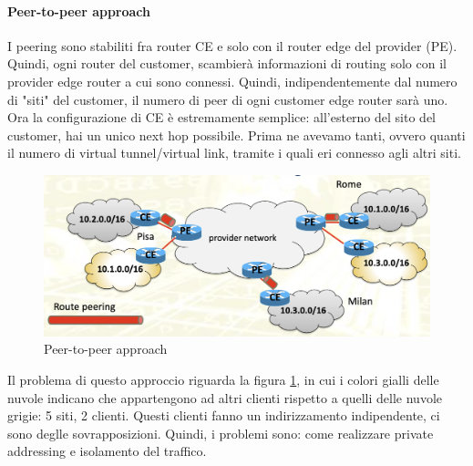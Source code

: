 \documentclass{article}
\begin{document}
\paragraph{Peer-to-peer approach} I peering sono stabiliti fra router CE e solo con il router edge del provider (PE). Quindi, ogni router del customer, scambierà informazioni di routing solo con il provider edge router a cui sono connessi. Quindi, indipendentemente dal numero di "siti" del customer, il numero di peer di ogni customer edge router sarà uno. Ora la configurazione di CE è estremamente semplice: all'esterno del sito del customer, hai un unico next hop possibile. Prima ne avevamo tanti, ovvero quanti il numero di virtual tunnel/virtual link, tramite i quali eri connesso agli altri siti. 
\begin{figure}[H]
    \centering
    \includegraphics[scale=0.5]{figures/peer-to-peer approach.png}
    \caption{Peer-to-peer approach}\label{figura:peer}
\end{figure}
\noindent Il problema di questo approccio riguarda la figura \ref{figura:peer}, in cui i colori gialli delle nuvole indicano che appartengono ad altri clienti rispetto a quelli delle nuvole grigie: 5 siti, 2 clienti. Questi clienti fanno un indirizzamento indipendente, ci sono deglle sovrapposizioni. Quindi, i problemi sono: come realizzare private addressing e isolamento del traffico. \\
\end{document}
